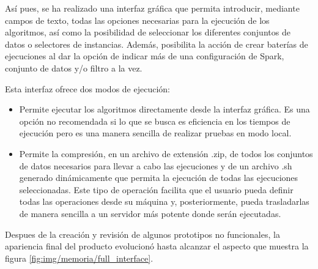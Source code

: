 Así pues, se ha realizado una interfaz gráfica que permita introducir, mediante campos de texto, todas las opciones necesarias para la ejecución de los algoritmos, así como la posibilidad de seleccionar los diferentes conjuntos de datos o selectores de instancias. Además, posibilita la acción de crear baterías de ejecuciones al dar la opción de indicar más de una configuración de Spark, conjunto de datos y/o filtro a la vez.

Esta interfaz ofrece dos modos de ejecución:

\begin{itemize}
\item Permite ejecutar los algoritmos directamente desde la interfaz gráfica. Es una opción no recomendada si lo que se busca es eficiencia en los tiempos de ejecución pero es una manera sencilla de realizar pruebas en modo local.
\item Permite la compresión, en un archivo de extensión .zip, de todos los conjuntos de datos necesarios para llevar a cabo las ejecuciones y de un archivo .sh generado dinámicamente que permita la ejecución de todas las ejecuciones seleccionadas. Este tipo de operación facilita que el usuario pueda definir todas las operaciones desde su máquina y, posteriormente, pueda trasladarlas de manera sencilla a un servidor más potente donde serán ejecutadas.
\end{itemize}

Despues de la creación y revisión de algunos prototipos no funcionales, la apariencia final del producto evolucionó hasta alcanzar el aspecto que muestra la figura \ref{fig:img/memoria/full_interface}.


